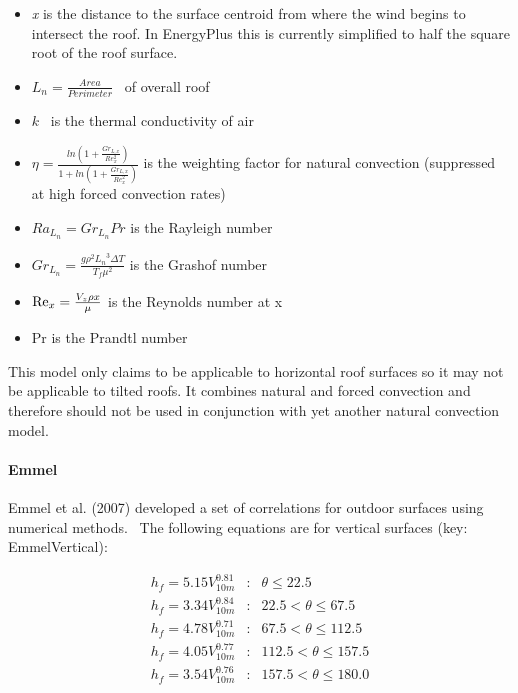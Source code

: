 \begin{itemize}
\item
  \emph{x} is the distance to the surface centroid from where the wind begins to intersect the roof. In EnergyPlus this is currently simplified to half the square root of the roof surface.
\item
  \({L_n} = \frac{{Area}}{{Perimeter}}\) ~of overall roof
\item
  \(k\) ~is the thermal conductivity of air
\item
  $\eta  = \frac{ln \left( 1 + \frac{Gr_{L,x}}{Re_x^2} \right)}{1 + ln \left( 1 + \frac{Gr_{L,x}}{Re_x^2} \right)}$ is the weighting factor for natural convection (suppressed at high forced convection rates)
\item
  $Ra_{L_n} = Gr_{L_n} Pr$ is the Rayleigh number
\item
  \(G{r_{{L_n}}} = \frac{{g{\rho ^2}{L_n}^3\Delta T}}{{{T_f}{\mu ^2}}}\) is the Grashof number
\item
  \({{\mathop{\rm Re}\nolimits}_x} = \frac{{{V_z}\rho x}}{\mu }\) is the Reynolds number at x
\item
  Pr is the Prandtl number
\end{itemize}

This model only claims to be applicable to horizontal roof surfaces so it may not be applicable to tilted roofs. It combines natural and forced convection and therefore should not be used in conjunction with yet another natural convection model.

\paragraph{Emmel}\label{emmel}

Emmel et al. (2007) developed a set of correlations for outdoor surfaces using numerical methods.~ The following equations are for vertical surfaces (key: EmmelVertical):

\begin{equation}
\begin{array}{lcl}
    h_f = 5.15V^{0.81}_{10m} & : & \theta \leq 22.5 \\
    h_f = 3.34V^{0.84}_{10m} & : & 22.5 < \theta \leq 67.5 \\
    h_f = 4.78V^{0.71}_{10m} & : & 67.5 < \theta \leq 112.5 \\
    h_f = 4.05V^{0.77}_{10m} & : & 112.5 < \theta \leq 157.5 \\
    h_f = 3.54V^{0.76}_{10m} & : & 157.5 < \theta \leq 180.0
\end{array}
\end{equation}

